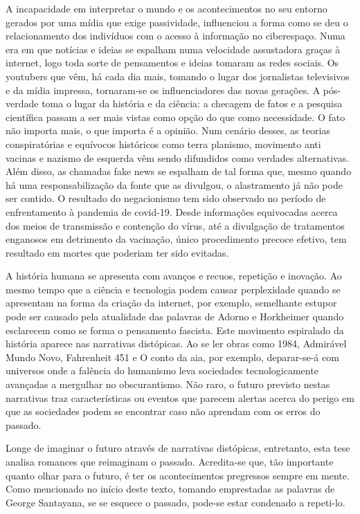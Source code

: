 \documentclass[../DISSERTACAO_MAIN.tex]{subfiles}
\begin{document}
A incapacidade em interpretar o mundo e os acontecimentos no seu entorno gerados por uma mídia que exige passividade, influenciou a forma como se deu o relacionamento dos indivíduos com o acesso à informação no ciberespaço. Numa era em que notícias e ideias se espalham numa velocidade assustadora graças à internet, logo toda sorte de pensamentos e ideias tomaram as redes sociais. Os youtubers que vêm, há cada dia mais, tomando o lugar dos jornalistas televisivos e da mídia impressa, tornaram-se os influenciadores das novas gerações. A pós-verdade toma o lugar da história e da ciência: a checagem de fatos e a pesquisa científica passam a ser mais vistas como opção do que como necessidade. O fato não importa mais, o que importa é a opinião. Num cenário desses, as teorias conspiratórias e equívocos históricos como terra planismo, movimento anti vacinas e nazismo de esquerda vêm sendo difundidos como verdades alternativas.  Além disso, as chamadas fake news se espalham de tal forma que, mesmo quando há uma responsabilização da fonte que as divulgou, o alastramento já não pode ser contido. O resultado do negacionismo tem sido observado no período de enfrentamento à pandemia de covid-19. Desde informações equivocadas acerca dos meios de transmissão e contenção do vírus, até a divulgação de tratamentos enganosos em detrimento da vacinação, único procedimento precoce efetivo, tem resultado em mortes que poderiam ter sido evitadas. 
 
A história humana se apresenta com avanços e recuos, repetição e inovação. Ao mesmo tempo que a ciência e tecnologia podem causar perplexidade quando se apresentam na forma da criação da internet, por exemplo, semelhante estupor pode ser causado pela atualidade das palavras de Adorno e Horkheimer quando esclarecem como se forma o pensamento fascista. Este movimento espiralado da história aparece nas narrativas distópicas. Ao se ler obras como 1984, Admirável Mundo Novo, Fahrenheit 451 e O conto da aia, por exemplo, deparar-se-á com universos onde a falência do humanismo leva sociedades tecnologicamente avançadas a mergulhar no obscurantismo. Não raro, o futuro previsto nestas narrativas traz características ou eventos que parecem alertas acerca do perigo em que as sociedades podem se encontrar caso não aprendam com os erros do passado.

Longe de imaginar o futuro através de narrativas distópicas, entretanto, esta tese analisa romances que reimaginam o passado. Acredita-se que, tão importante quanto olhar para o futuro, é ter os acontecimentos pregressos sempre em mente. Como mencionado no início deste texto, tomando emprestadas as palavras de George Santayana, se se esquece o passado, pode-se estar condenado a repeti-lo. 
\end{document}
